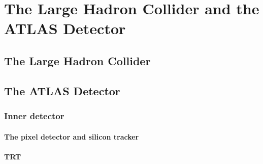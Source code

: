 \chapter{The Large Hadron Collider and the ATLAS Detector}
\label{chap:lhcatlas}

\section{The Large Hadron Collider}
\label{chap:lhcatlas:sec:lhc}

\section{The ATLAS Detector}



\subsection{Inner detector}
\label{chap:lhcatlas:sec:innerdetector}

\subsubsection{The pixel detector and silicon tracker}
\subsubsection{TRT}
